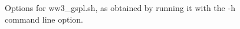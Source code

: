 \begin{figure}[t]
{\scriptsize  }
\caption{Options for {\file ww3\_gspl.sh}, as obtained by running it with the
  {\file -h} command line option.} \label{fig:gspl}
\end{figure}
